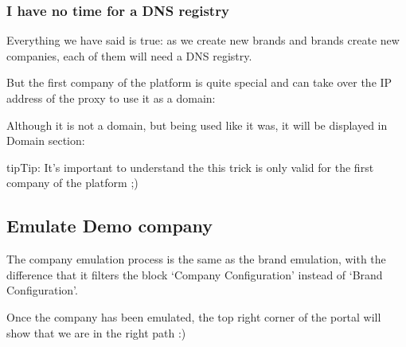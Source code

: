 \documentclass[letterpaper,10pt,english]{sphinxmanual}
\begin{document}
\subsubsection{I have no time for a DNS registry}
\label{getting_started/internal_calls/brand_portal:dnshack}\label{getting_started/internal_calls/brand_portal:i-have-no-time-for-a-dns-registry}
Everything we have said is true: as we create new brands and brands create new
companies, each of them will need a DNS registry.

But the first company of the platform is quite special and can take over the IP
address of the proxy to use it as a domain:

\noindent{}

Although it is not a domain, but being used like it was, it will be displayed
in Domain section:

\noindent{}

\begin{notice}{tip}{Tip:}
It’s important to understand the this trick is only valid for the first
company of the platform ;)
\end{notice}


\subsection{Emulate Demo company}
\label{getting_started/internal_calls/brand_portal:emulate-company}\label{getting_started/internal_calls/brand_portal:emulate-demo-company}
The company emulation process is the same as the brand emulation, with the
difference that it filters the block ‘Company Configuration’ instead of
‘Brand Configuration’.



Once the company has been emulated, the top right corner of the portal will
show that we are in the right path :)

\end{document}
